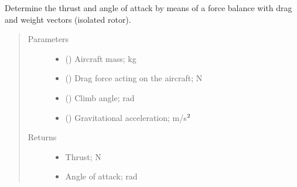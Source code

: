 \documentclass[letterpaper,10pt,english]{sphinxmanual}
\begin{document}
\begin{fulllineitems}
\begin{fulllineitems}
\begin{quote}
\begin{description}
\end{description}\end{quote}

\end{fulllineitems}


\begin{fulllineitems}
\label{\detokenize{modules/aircraft:aircraft.Aircraft.get_thrust_and_alpha}}
\sphinxAtStartPar
Determine the thrust and angle of attack by means of a force balance
with drag and weight vectors (isolated rotor).
\begin{quote}\begin{description}
\item[{Parameters}] \leavevmode\begin{itemize}
\item {} 
\sphinxAtStartPar
{} () \textendash{} Aircraft mass; kg

\item {} 
\sphinxAtStartPar
{} () \textendash{} Drag force acting on the aircraft; N

\item {} 
\sphinxAtStartPar
{} () \textendash{} Climb angle; rad

\item {} 
\sphinxAtStartPar
{} () \textendash{} Gravitational acceleration; m/s\(\sp{\text{2}}\)

\end{itemize}

\item[{Returns}] \leavevmode
\sphinxAtStartPar
\begin{itemize}
\item {} 
\sphinxAtStartPar
{} \textendash{} Thrust; N

\item {} 
\sphinxAtStartPar
{} \textendash{} Angle of attack; rad

\end{itemize}


\end{description}\end{quote}

\end{fulllineitems}


\end{fulllineitems}
\end{document}
